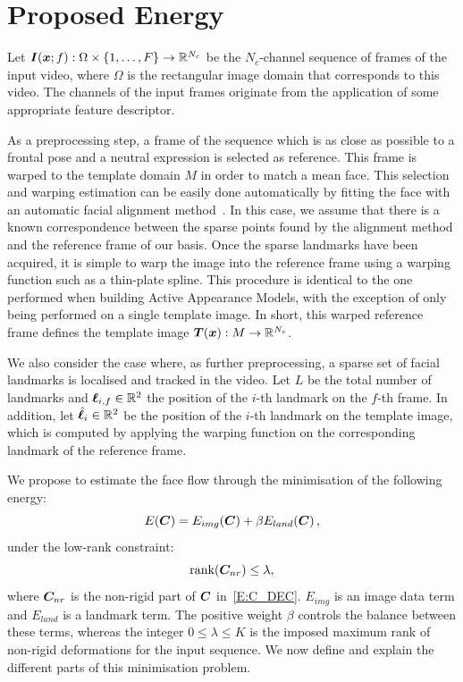 \section{Proposed Energy}
Let $\boldsymbol{I}(\boldsymbol{x};f):\Omega\times \{1,\ldots,F\} \rightarrow \mathbb{R}^{N_c}$ be the
$N_c$-channel sequence of frames of the input video, where $\Omega$ is the
rectangular image domain that corresponds to this video. The channels of the
input frames originate from the application of some appropriate feature descriptor.

As a preprocessing step, a frame of the sequence which is as close as possible to
a frontal pose and a neutral expression is selected as reference. This frame is
warped to the template domain $M$ in order to match a mean face. This selection
and warping estimation can be easily done automatically by fitting the face
with an automatic facial alignment method~\cite{kazemi2014one,matthews2004active}.
In this case, we assume that there is a known correspondence between the sparse points
found by the alignment method and the reference frame of our basis. Once the
sparse landmarks have been acquired, it is simple to warp the image into the
reference frame using a warping function such as a thin-plate spline. This
procedure is identical to the one performed when building Active Appearance
Models, with the exception of only being performed on a single template image.
In short, this warped reference frame defines the template image
$\boldsymbol{T}(\boldsymbol{x}):M \rightarrow \mathbb{R}^{N_c}$.

We also consider the case where, as further preprocessing, a sparse set of facial
landmarks is localised and tracked in the video. Let $L$ be the total number of
landmarks and $\boldsymbol{\ell}_{i,f}\in\mathbb{R}^2$ the position of the $i$-th landmark on the
$f$-th frame. In addition, let $\hat{\boldsymbol{\ell}}_i\in\mathbb{R}^2$ be the position of the
$i$-th landmark on the template image, which is computed by applying the warping
function on the corresponding landmark of the reference frame.

We propose to estimate the face flow through the minimisation of the following energy:
\begin{equation}
    E(\boldsymbol{C}) = E_{img}(\boldsymbol{C}) + \beta E_{land}(\boldsymbol{C}) \,,
\end{equation}
under the low-rank constraint:
\begin{equation}\label{eq:lowrank}
    \mbox{rank}(\boldsymbol{C}_{nr}) \leq \lambda,
\end{equation}
where $\boldsymbol{C}_{nr}$ is the non-rigid part of $\boldsymbol{C}$ in~\cref{E:C_DEC}.
$E_{img}$ is an image data
term and $E_{land}$ is a landmark term. The positive weight $\beta$
controls the balance between these terms, whereas the integer $0\leq\lambda\leq K$ is the
imposed maximum rank of non-rigid deformations for the input sequence.
We now define and explain the different parts of this minimisation problem.

